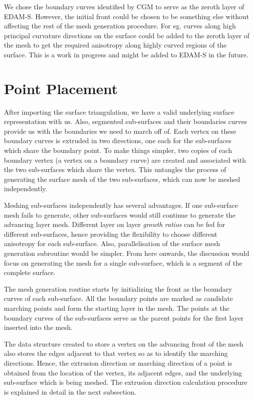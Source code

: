We chose the boundary curves identified by CGM to serve as the zeroth layer of EDAM-S. However, the initial front could be chosen to be something else without affecting the rest of the mesh generation procedure. For eg. curves along high principal curvature directions on the surface could be added to the zeroth layer of the mesh to get the required anisotropy along highly curved regions of the surface. This is a work in progress and might be added to EDAM-S in the future.

\section{Point Placement}

After importing the surface triangulation, we have a valid underlying surface representation with us. Also, segmented sub-surfaces and their boundaries curves provide us with the boundaries we need to march off of. Each vertex on these boundary curves is extruded in two directions, one each for the sub-surfaces which share the boundary point. To make things simpler, two copies of each boundary vertex (a vertex on a boundary curve) are created and associated with the two sub-surfaces which share the vertex. This untangles the process of generating the surface mesh of the two sub-surfaces, which can now be meshed independently. 

Meshing sub-surfaces independently has several advantages. If one sub-surface mesh fails to generate, other sub-surfaces would still continue to generate the advancing layer mesh. Different layer on layer \textit{growth ratios} can be fed for different sub-surfaces, hence providing the flexibility to choose different anisotropy  for each sub-surface. Also, parallelisation of the surface mesh generation subroutine would be simpler. From here onwards,  the discussion would focus on generating the mesh for a single sub-surface, which is a segment of the complete surface. 

The mesh generation routine starts by initializing the front as the boundary curves of each sub-surface. All the boundary points are marked as candidate marching points and form the starting layer in the mesh. The points at the boundary curves of the sub-surfaces serve as the parent points for the first layer inserted into the mesh.

The data structure created to store a vertex on the advancing front of the mesh also stores the edges adjacent to that vertex so as to identify the marching directions. Hence, the extrusion direction or marching direction of a point is obtained from the location of the vertex, its adjacent edges, and the underlying sub-surface which is being meshed. The extrusion direction calculation procedure is explained in detail in the next subsection.

